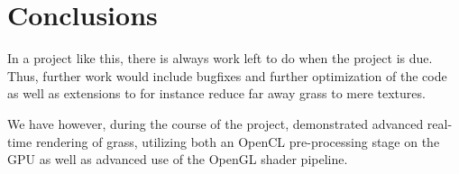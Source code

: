\section{Conclusions}
\label{cha:conclusions}
In a project like this, there is always work left to do when the project is due.
Thus, further work would include bugfixes and further optimization of the code as well as
extensions to for instance reduce far away grass to mere textures.

We have however, during the course of the project, demonstrated advanced
real-time rendering of grass, utilizing both an OpenCL pre-processing stage
on the GPU as well as advanced use of the OpenGL shader pipeline.


